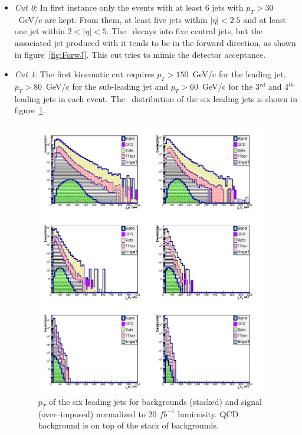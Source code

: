 \begin{itemize}

\item \textit{Cut 0}: In first instance only the events with at least 6 jets with ${p_T > 30}$~GeV/c are kept. From them, at least five jets within $|\eta|<2.5$ and at least one jet within $2<|\eta|<5$. The \Tp~decays into five central jets, but the associated jet produced with it tends to be in the forward direction, as shown in figure~\ref{fig:ForwJ}. This cut tries to mimic the detector acceptance.

\item \textit{Cut 1}: The first kinematic cut requires ${p_{T}>150}$~GeV/c for the leading jet, ${p_{T}>80}$~GeV/c for the sub-leading jet and ${p_{T}>60}$~GeV/c for the 3$^{rd}$ and 4$^{th}$ leading jets in each event. The \pt~distribution of the six leading jets is shown in figure~\ref{fig:Var1}.

\begin{figure}[!Hhtbp]
  \begin{center}
    \includegraphics[width=0.95\textwidth]{figs/Pheno/JetPt.png}
    \caption{$p_{T}$  of the six leading jets for backgrounds (stacked) and signal (over--imposed) normalized to 20 $fb^{-1}$ luminosity. QCD background is on top of the stack of backgrounds.}
    \label{fig:Var1}
  \end{center}
\end{figure}


\end{itemize}
